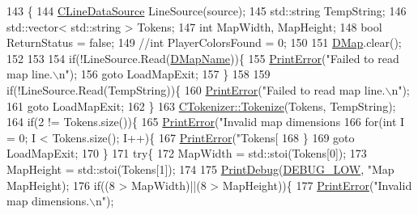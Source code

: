 \begin{DoxyCode}
143                                                             \{     
144     \hyperlink{classCLineDataSource}{CLineDataSource} LineSource(source);
145     std::string TempString;
146     std::vector< std::string > Tokens;
147     \textcolor{keywordtype}{int} MapWidth, MapHeight;
148     \textcolor{keywordtype}{bool} ReturnStatus = \textcolor{keyword}{false};
149     \textcolor{comment}{//int PlayerColorsFound = 0;}
150     
151     \hyperlink{classCTerrainMap_a80d154ce478948b10473534a7bca13f6}{DMap}.clear();
152     
153 
154     \textcolor{keywordflow}{if}(!LineSource.Read(\hyperlink{classCTerrainMap_a9026e4a5f073885b9e9fc3b43e93caa6}{DMapName}))\{
155         \hyperlink{Debug_8h_a2ed825eefefe35baf59a93a8c641323d}{PrintError}(\textcolor{stringliteral}{"Failed to read map line.\(\backslash\)n"});
156         \textcolor{keywordflow}{goto} LoadMapExit;
157     \}
158     
159     \textcolor{keywordflow}{if}(!LineSource.Read(TempString))\{
160         \hyperlink{Debug_8h_a2ed825eefefe35baf59a93a8c641323d}{PrintError}(\textcolor{stringliteral}{"Failed to read map line.\(\backslash\)n"});
161         \textcolor{keywordflow}{goto} LoadMapExit;
162     \}
163     \hyperlink{classCTokenizer_a7477f6849a3d0a5154879d8622e4012c}{CTokenizer::Tokenize}(Tokens, TempString);
164     \textcolor{keywordflow}{if}(2 != Tokens.size())\{
165         \hyperlink{Debug_8h_a2ed825eefefe35baf59a93a8c641323d}{PrintError}(\textcolor{stringliteral}{"Invalid map dimensions %
166         \textcolor{keywordflow}{for}(\textcolor{keywordtype}{int} I = 0; I < Tokens.size(); I++)\{
167             \hyperlink{Debug_8h_a2ed825eefefe35baf59a93a8c641323d}{PrintError}(\textcolor{stringliteral}{"Tokens[%
168         \}
169         \textcolor{keywordflow}{goto} LoadMapExit;
170     \}
171     \textcolor{keywordflow}{try}\{
172         MapWidth = std::stoi(Tokens[0]);
173         MapHeight = std::stoi(Tokens[1]);
174             
175         \hyperlink{Debug_8h_aa5f00f5537c9760f6ae1782460748ab9}{PrintDebug}(\hyperlink{Debug_8h_a3a5f3fc09784650d8388cb854882f840}{DEBUG\_LOW}, \textcolor{stringliteral}{"Map %
      MapHeight); 
176         \textcolor{keywordflow}{if}((8 > MapWidth)||(8 > MapHeight))\{
177             \hyperlink{Debug_8h_a2ed825eefefe35baf59a93a8c641323d}{PrintError}(\textcolor{stringliteral}{"Invalid map dimensions.\(\backslash\)n"});
}}}
\end{DoxyCode}
